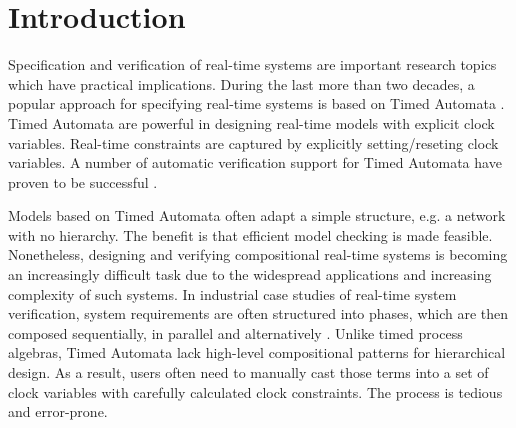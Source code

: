 \documentclass[acmsmall,10pt,review]{acmart}
\begin{document}


  



\maketitle

\section{Introduction}
\label{Introduction}


Specification and verification of real-time systems are important 
research topics which have practical implications. During the last 
more than two decades, a popular approach for specifying real-time systems is 
based on Timed Automata \cite{DBLP:journals/tcs/AlurD94}. 
Timed Automata are powerful 
in designing real-time models with explicit clock variables. Real-time 
constraints are captured by explicitly setting/reseting clock variables. 
A number of automatic verification support for Timed Automata have proven 
to be successful \cite{DBLP:journals/sttt/LarsenPY97,yovine1997kronos,wang2005verifying}.


Models based on Timed Automata often adapt a simple structure, e.g. a 
network with no hierarchy. The benefit is that 
efficient model checking is made feasible. Nonetheless, designing and 
verifying compositional real-time systems is becoming an increasingly 
difficult task due to the widespread applications and increasing complexity 
of such systems. In industrial case studies of real-time system verification, system 
requirements are often structured into phases, which are then composed 
sequentially, in parallel and alternatively \cite{DBLP:conf/emsoft/LarsenMNS05}. 
Unlike timed process algebras, Timed Automata lack high-level 
compositional patterns for hierarchical design. As a result, users often 
need to manually cast those terms into a set of clock variables with 
carefully calculated clock constraints. The process is tedious and error-prone.
\end{document}
